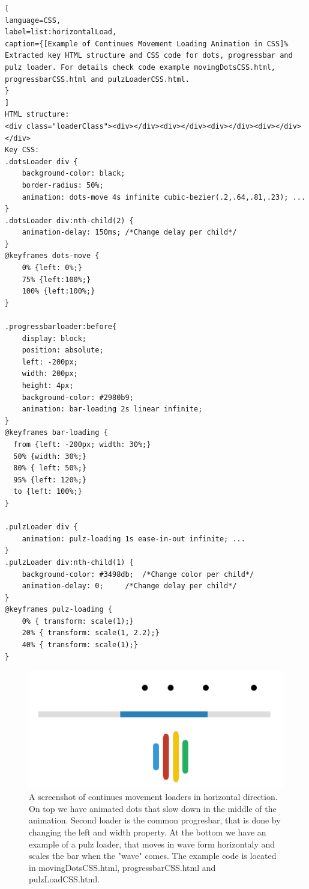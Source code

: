 \begin{lstlisting}[
language=CSS,
label=list:horizontalLoad,
caption={[Example of Continues Movement Loading Animation in CSS]%
Extracted key HTML structure and CSS code for dots, progressbar and pulz loader. For details check code example movingDotsCSS.html, progressbarCSS.html and pulzLoaderCSS.html.
}
]
HTML structure:
<div class="loaderClass"><div></div><div></div><div></div><div></div></div>
Key CSS:
.dotsLoader div {
	background-color: black;
	border-radius: 50%;
	animation: dots-move 4s infinite cubic-bezier(.2,.64,.81,.23); ...
}
.dotsLoader div:nth-child(2) {
	animation-delay: 150ms; /*Change delay per child*/
}
@keyframes dots-move {
	0% {left: 0%;}
	75% {left:100%;}
	100% {left:100%;}
}

.progressbarloader:before{
	display: block;
	position: absolute;
	left: -200px;
	width: 200px;
	height: 4px;
	background-color: #2980b9;
	animation: bar-loading 2s linear infinite;
}
@keyframes bar-loading {
  from {left: -200px; width: 30%;}
  50% {width: 30%;}
  80% { left: 50%;}
  95% {left: 120%;}
  to {left: 100%;}
}

.pulzLoader div {
	animation: pulz-loading 1s ease-in-out infinite; ...
}
.pulzLoader div:nth-child(1) {  
	background-color: #3498db;  /*Change color per child*/
	animation-delay: 0;     /*Change delay per child*/
}
@keyframes pulz-loading {
	0% { transform: scale(1);}
	20% { transform: scale(1, 2.2);}
	40% { transform: scale(1);}
}
\end{lstlisting}

\begin{figure}[h]
\centering
\includegraphics[keepaspectratio,width=\hsize,height=\halfh]
{images/horizontalLoad.png}

\caption[Continues Horizontal Movement Loading Examples]{
A screenshot of continues movement loaders in horizontal direction. On top we have animated dots that slow down in the middle of the animation. Second loader is the common progresbar, that is done by changing the left and width property. At the bottom we have an example of a pulz loader, that moves in wave form horizontaly and scales the bar when the "wave" comes. The example code is located in movingDotsCSS.html, progressbarCSS.html and pulzLoadCSS.html.
}
\label{fig:rotationLoad}
\end{figure}

